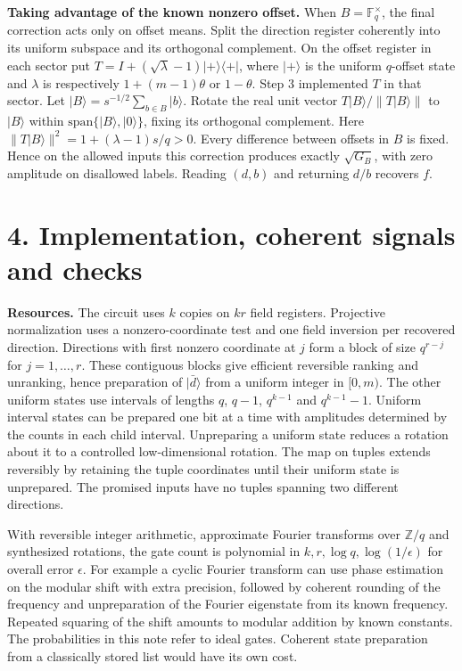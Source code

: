 \documentclass[11pt]{article}
\newcommand{\F}{\mathbb F_q}
\newcommand{\ket}[1]{\lvert #1\rangle}
\newcommand{\bra}[1]{\langle #1\rvert}
\begin{document}
\textbf{Taking advantage of the known nonzero offset.}
When $B=\F^\times$, the final correction acts only on offset means. Split
the direction register coherently into its uniform subspace and its
orthogonal complement. On the offset register in each sector put
$T=I+(\sqrt\lambda-1)\ket{+}\bra{+}$, where $\ket{+}$ is the uniform
$q$-offset state and $\lambda$ is respectively $1+(m-1)\theta$ or
$1-\theta$. Step 3 implemented $T$ in that sector. Let
$\ket B=s^{-1/2}\sum_{b\in B}\ket b$. Rotate the real unit vector
$T\ket B/\|T\ket B\|$ to $\ket B$ within
$\mathrm{span}\{\ket B,\ket0\}$, fixing its orthogonal complement.
Here $\|T\ket B\|^2=1+(\lambda-1)s/q>0$.
Every difference between offsets in $B$ is fixed. Hence on the allowed
inputs this correction produces exactly $\sqrt{G_B}$, with zero amplitude
on disallowed labels. Reading $(d,b)$ and returning $d/b$ recovers $f$.

\newpage
\section*{4. Implementation, coherent signals and checks}
\textbf{Resources.} The circuit uses $k$ copies on $kr$ field registers.
Projective normalization uses a nonzero-coordinate test and one field
inversion per recovered direction. Directions with first nonzero coordinate
at $j$ form a block of size $q^{r-j}$ for $j=1,\ldots,r$. These contiguous
blocks give efficient reversible ranking and unranking, hence preparation
of $\ket{\bar d}$ from a uniform integer in $[0,m)$. The other uniform
states use intervals of lengths $q$, $q-1$, $q^{k-1}$ and $q^{k-1}-1$.
Uniform interval states can be prepared one bit at a time with amplitudes
determined by the counts in each child interval. Unpreparing a uniform
state reduces a rotation about it to a controlled low-dimensional rotation.
The map on tuples extends reversibly by retaining the tuple coordinates
until their uniform state is unprepared. The promised inputs have no
tuples spanning two different directions.

With reversible integer arithmetic, approximate Fourier transforms over
$\mathbb Z/q$ and synthesized rotations, the gate count is polynomial in
$k,r,\log q,\log(1/\epsilon)$ for overall error $\epsilon$. For example a
cyclic Fourier transform can use phase estimation on the modular shift
with extra precision, followed by coherent rounding of the frequency
and unpreparation of the Fourier eigenstate from its known frequency.
Repeated squaring of the shift amounts to modular addition by known
constants. The probabilities in this note refer to ideal gates. Coherent
state preparation from a classically stored list would have its own cost.
\end{document}
